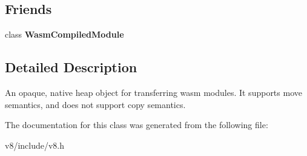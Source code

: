 \subsection*{Friends}
\begin{DoxyCompactItemize}
\item 
\mbox{\label{classv8_1_1WasmCompiledModule_1_1TransferrableModule_aa06dc5f793f5043ce27d45b99ea43fa9}} 
class {\bfseries Wasm\+Compiled\+Module}
\end{DoxyCompactItemize}


\subsection{Detailed Description}
An opaque, native heap object for transferring wasm modules. It supports move semantics, and does not support copy semantics. 

The documentation for this class was generated from the following file\+:\begin{DoxyCompactItemize}
\item 
v8/include/v8.\+h\end{DoxyCompactItemize}
